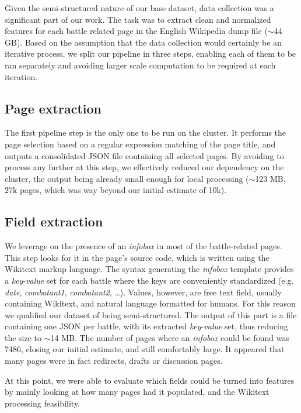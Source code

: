 Given the semi-structured nature of our base dataset, data collection was a significant part of our work. The task was to extract clean and normalized features for each battle related page in the English Wikipedia dump file ($\sim $44 GB). Based on the assumption that the data collection would certainly be an iterative process, we split our pipeline in three steps, enabling each of them to be ran separately and avoiding larger scale computation to be required at each iteration.

\subsection{Page extraction}
The first pipeline step is the only one to be run on the cluster. It performs the page selection based on a regular expression matching of the page title, and outputs a consolidated JSON file containing all selected pages. By avoiding to process any further at this step, we effectively reduced our dependency on the cluster, the output being already small enough for local processing ($\sim $123 MB, 27k pages, which was way beyond our initial estimate of 10k).

\subsection{Field extraction}
We leverage on the presence of an \textit{infobox} in most of the battle-related pages. This step looks for it in the page's source code, which is written using the Wikitext\cite{wikitext} markup language. The syntax generating the \textit{infobox} template\cite{template} provides a \textit{key}-\textit{value} set for each battle where the keys are conveniently standardized (e.g. \textit{date}, \textit{combatant1}, \textit{combatant2}, \dots).   Values, however, are free text field, usually containing Wikitext, and natural language formatted for humans. For this reason we qualified our dataset of being semi-structured. The output of this part is a file containing one JSON per battle, with its extracted \textit{key}-\textit{value} set, thus reducing the size to $\sim $14 MB. The number of pages where an \textit{infobox} could be found was 7486, closing our initial estimate, and still comfortably large. It appeared that many pages were in fact redirects, drafts or discussion pages.  

At this point, we were able to evaluate which fields could be turned into features by mainly looking at how many pages had it populated, and the Wikitext processing feasibility. 

